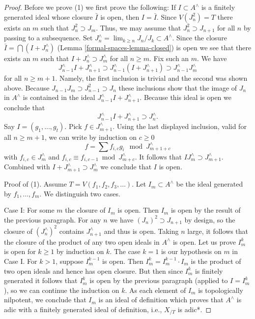 \begin{proof}
\medskip\noindent
Before we prove (1) we first prove the following: If $I \subset A^\wedge$ is
a finitely generated ideal whose closure $\bar I$ is open, then $I = \bar I$.
Since $V(J_n^2) = T$ there exists an $m$ such that $J_n^2 \supset J_m$.
Thus, we may assume that $J_n^2 \supset J_{n + 1}$ for all $n$ by passing
to a subsequence. Set $J_n^\wedge = \lim_{k \geq n} J_n/J_k \subset A^\wedge$.
Since the closure $\bar I = \bigcap (I + J_n^\wedge)$
(Lemma \ref{formal-spaces-lemma-closed}) is open we see that there exists an $m$ such that
$I + J_n^\wedge \supset J_m^\wedge$ for all $n \geq m$. Fix such an $m$.
We have
$$
J_{n - 1}^\wedge I + J_{n + 1}^\wedge \supset
J_{n - 1}^\wedge (I + J_{n + 1}^\wedge) \supset
J_{n - 1}^\wedge J_m^\wedge
$$
for all $n \geq m + 1$. Namely, the first inclusion is trivial and the
second was shown above. Because $J_{n - 1}J_m \supset J_{n - 1}^2 \supset J_n$
these inclusions show that the image of $J_n$ in $A^\wedge$
is contained in the ideal $J_{n - 1}^\wedge I + J_{n + 1}^\wedge$.
Because this ideal is open we conclude that
$$
J_{n - 1}^\wedge I + J_{n + 1}^\wedge \supset J_n^\wedge.
$$
Say $I = (g_1, \ldots, g_t)$. Pick $f \in J_{m + 1}^\wedge$.
Using the last displayed inclusion, valid for all $n \geq m + 1$,
we can write by induction on $c \geq 0$
$$
f = \sum f_{i, c} g_i \mod J_{m + 1+ c}^\wedge
$$
with $f_{i, c} \in J_m^\wedge$ and
$f_{i, c} \equiv f_{i, c - 1} \bmod J_{m + c}^\wedge$.
It follows that $IJ_m^\wedge \supset J_{m + 1}^\wedge$.
Combined with $I + J_{m + 1}^\wedge \supset J_m^\wedge$
we conclude that $I$ is open.

\medskip\noindent
Proof of (1). Assume $T = V(f_1, f_2, f_3, \ldots)$.
Let $I_m \subset A^\wedge$ be the ideal generated by $f_1, \ldots, f_m$.
We distinguish two cases.

\medskip\noindent
Case I: For some $m$ the closure of $I_m$ is open.
Then $I_m$ is open by the result of the previous paragraph.
For any $n$ we have $(J_n)^2 \supset J_{n+1}$ by design, so
the closure of $(J_n^\wedge)^2$ contains $J_{n+1}^\wedge$
and thus is open.  Taking $n$ large, it follows that the closure
of the product of any two open ideals in $A^\wedge$ is open.
Let us prove $I_m^k$ is open for $k \ge 1$ by induction on $k$.
The case $k = 1$ is our hypothesis on $m$ in Case I.
For $k > 1$, suppose $I_m^{k - 1}$ is open. Then
$I_m^k = I_m^{k - 1} \cdot I_m$ is the product of two open ideals
and hence has open closure. But then since $I_m^k$
is finitely generated it follows that $I_m^k$
is open by the previous paragraph (applied to $I = I_m^k$),
so we can continue the induction on $k$.
As each element of $I_m$ is topologically nilpotent, we conclude
that $I_m$ is an ideal of definition which proves that $A^\wedge$
is adic with a finitely generated ideal of definition, i.e.,
$X_{/T}$ is adic*.


\end{proof}
